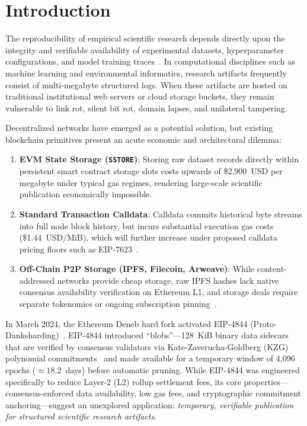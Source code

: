 \section{Introduction}
\label{sec:introduction}

The reproducibility of empirical scientific research depends directly upon the integrity and verifiable availability of experimental datasets, hyperparameter configurations, and model training traces~\cite{wilkinson2016fair}. In computational disciplines such as machine learning and environmental informatics, research artifacts frequently consist of multi-megabyte structured logs. When these artifacts are hosted on traditional institutional web servers or cloud storage buckets, they remain vulnerable to link rot, silent bit rot, domain lapses, and unilateral tampering. 

Decentralized networks have emerged as a potential solution, but existing blockchain primitives present an acute economic and architectural dilemma:
\begin{enumerate}
    \item \textbf{EVM State Storage (\texttt{SSTORE})}: Storing raw dataset records directly within persistent smart contract storage slots costs upwards of \$2,900~USD per megabyte under typical gas regimes, rendering large-scale scientific publication economically impossible.
    \item \textbf{Standard Transaction Calldata}: Calldata commits historical byte streams into full node block history, but incurs substantial execution gas costs (\$1.44~USD/MiB), which will further increase under proposed calldata pricing floors such as EIP-7623~\cite{piet2024eip7623}.
    \item \textbf{Off-Chain P2P Storage (IPFS, Filecoin, Arweave)}: While content-addressed networks provide cheap storage, raw IPFS hashes lack native consensus availability verification on Ethereum L1, and storage deals require separate tokenomics or ongoing subscription pinning~\cite{benet2014ipfs,protocol2017filecoin}.
\end{enumerate}

In March 2024, the Ethereum Deneb hard fork activated EIP-4844 (Proto-Danksharding)~\cite{buterin2022eip4844}. EIP-4844 introduced ``blobs''---128~KiB binary data sidecars that are verified by consensus validators via Kate-Zaverucha-Goldberg (KZG) polynomial commitments~\cite{kate2010polynomial} and made available for a temporary window of 4,096 epochs ($\approx 18.2$~days) before automatic pruning. While EIP-4844 was engineered specifically to reduce Layer-2 (L2) rollup settlement fees, its core properties---consensus-enforced data availability, low gas fees, and cryptographic commitment anchoring---suggest an unexplored application: \textit{temporary, verifiable publication for structured scientific research artifacts}.

